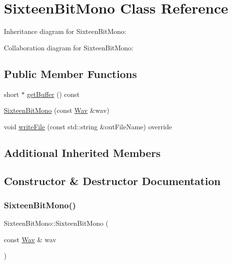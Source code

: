 \hypertarget{classSixteenBitMono}{}\section{Sixteen\+Bit\+Mono Class Reference}
\label{classSixteenBitMono}


Inheritance diagram for Sixteen\+Bit\+Mono\+:


Collaboration diagram for Sixteen\+Bit\+Mono\+:
\subsection*{Public Member Functions}
\begin{DoxyCompactItemize}
\item 
short $\ast$ \hyperlink{classSixteenBitMono_ae5ac457f6ab42ee169800d890b676415}{get\+Buffer} () const
\item 
\hyperlink{classSixteenBitMono_a2a234198df8a7729414ad40c68b1ee34}{Sixteen\+Bit\+Mono} (const \hyperlink{classWav}{Wav} \&wav)
\item 
void \hyperlink{classSixteenBitMono_a331ba2f00ff9614c1c0dc99ad6fb55f6}{write\+File} (const std\+::string \&out\+File\+Name) override
\end{DoxyCompactItemize}
\subsection*{Additional Inherited Members}


\subsection{Constructor \& Destructor Documentation}
\mbox{\label{classSixteenBitMono_a2a234198df8a7729414ad40c68b1ee34}} 
\subsubsection{\texorpdfstring{Sixteen\+Bit\+Mono()}{SixteenBitMono()}}
{\footnotesize\ttfamily Sixteen\+Bit\+Mono\+::\+Sixteen\+Bit\+Mono (\begin{DoxyParamCaption}\item[{const \hyperlink{classWav}{Wav} \&}]{wav }\end{DoxyParamCaption})}

